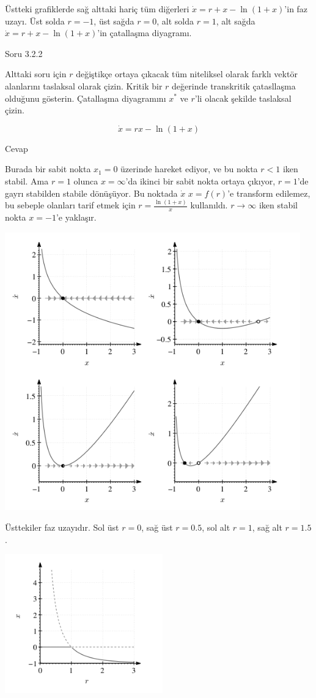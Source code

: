 \documentclass[12pt,fleqn]{article}\usepackage{../../common}
\begin{document}
Üstteki grafiklerde sağ alttaki hariç tüm diğerleri $\dot{x} = r+x-\ln(1+x)$'in
faz uzayı. Üst solda $r=-1$, üst sağda $r=0$, alt solda $r=1$, alt sağda
$\dot{x} = r+x-\ln(1+x)$'in çatallaşma diyagramı. 

Soru 3.2.2

Alttaki soru için $r$ değiştikçe ortaya çıkacak tüm niteliksel olarak farklı
vektör alanlarını taslaksal olarak çizin. Kritik bir $r$ değerinde transkritik
çatasllaşma olduğunu gösterin. Çatallaşma diyagramını $x^*$ ve $r$'li olacak şekilde
taslaksal çizin.

$$ \dot{x} = rx - \ln(1+x) $$

Cevap

Burada bir sabit nokta $x_1=0$ üzerinde hareket ediyor, ve bu nokta $r<1$ iken
stabil. Ama $r=1$ olunca $x=\infty$'da ikinci bir sabit nokta ortaya çıkıyor,
$r=1$'de gayrı stabilden stabile dönüşüyor. Bu noktada $\dot{x}$ $x=f(r)$'e
transform edilemez, bu sebeple olanları tarif etmek için $r =\frac{\ln(1+x)}{x}$
kullanıldı. $r\to\infty$ iken stabil nokta $x=-1$'e yaklaşır.


\includegraphics[height=12cm]{08_02.png}

Üsttekiler faz uzayıdır. Sol üst $r=0$, sağ üst $r=0.5$, sol alt $r=1$, sağ alt
$r=1.5$.

\includegraphics[height=6cm]{08_03.png}
\end{document}
